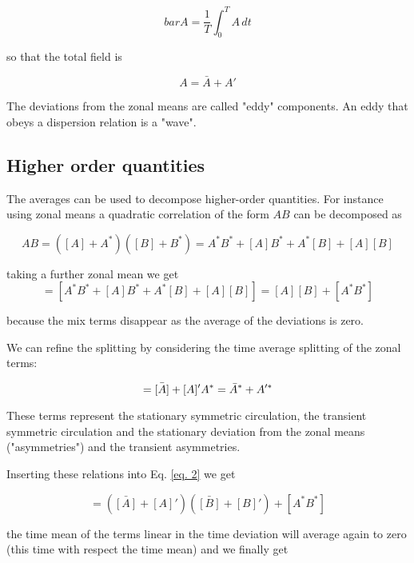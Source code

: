 \begin{equation}
    bar{A} = \frac{1}{T}\int_0^{T} A \, dt
\end{equation}

so that the total field is

\begin{equation}
    A = \bar{A} + A'
\end{equation}

The deviations from the zonal means are called "eddy" components. An
eddy that obeys a dispersion relation is a "wave".

\subsection{Higher order quantities}

The averages can be used to decompose higher-order quantities. For
instance using zonal means a quadratic correlation of the form \(A B\)
can be decomposed as

\begin{equation}
    A B = ([A]+A^*)([B]+B^*) = A^*B^* + [A] B^*+ A^*[B] + [A][B]
\end{equation}

taking a further zonal mean we get
\begin{equation}\label{eq. 2}
= [A^*B^*+ [A]B^* + A^*[B] + [A][B]] =  [A][B] + [A^*B^*]
\end{equation}

because the mix terms disappear as the average of the deviations is
zero.

We can refine the splitting by considering the time average splitting of
the zonal terms:

\begin{equation}
    = \bar{[A]} + [A]' \\
A^* = \bar{A}^* + A'^*
\end{equation}

These terms represent the stationary symmetric circulation, the
transient symmetric circulation and the stationary deviation from the
zonal means ("asymmetries") and the transient asymmetries.

Inserting these relations into Eq. \ref{eq. 2} we get


\begin{equation}
    = (\bar{[A]} + [A]')(\bar{[B]} + [B]') + [A^*B^*]
\end{equation}
    
the time mean of the terms linear in the time deviation will average
again to zero (this time with respect the time mean) and we finally get


